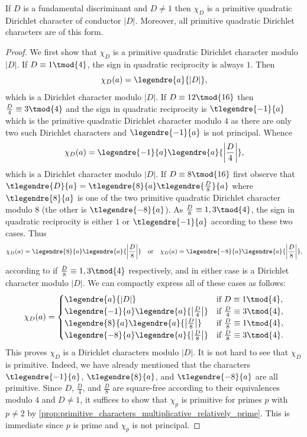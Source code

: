 \documentclass[12pt]{article}
\begin{document}
      \begin{theorem}\label{thm:fundamental_discriminant_character_primitive}
        If \(D\) is a fundamental discriminant and \(D \neq 1\) then \(\chi_{D}\) is a primitive quadratic Dirichlet character of conductor \(|D|\). Moreover, all primitive quadratic Dirichlet characters are of this form.
      \end{theorem}
      \begin{proof}
        We first show that \(\chi_{D}\) is a primitive quadratic Dirichlet character modulo \(|D|\). If \(D \equiv 1 \tmod{4}\), the sign in quadratic reciprocity is always \(1\). Then
        \[
          \chi_{D}(a) = \legendre{a}{|D|},
        \]
        which is a Dirichlet character modulo \(|D|\). If \(D \equiv 12 \tmod{16}\) then \(\frac{D}{4} \equiv 3 \tmod{4}\) and the sign in quadratic reciprocity is \(\tlegendre{-1}{a}\) which is the primitive quadratic Dirichlet character modulo \(4\) as there are only two such Dirichlet characters and \(\legendre{-1}{a}\) is not principal. Whence
        \[
          \chi_{D}(a) = \legendre{-1}{a}\legendre{a}{\left|\frac{D}{4}\right|},
        \]
        which is a Dirichlet character modulo \(|D|\). If \(D \equiv 8 \tmod{16}\) first observe that \(\tlegendre{D}{a} = \tlegendre{8}{a}\tlegendre{\frac{D}{8}}{a}\) where \(\tlegendre{8}{a}\) is one of the two primitive quadratic Dirichlet character modulo \(8\) (the other is \(\tlegendre{-8}{a}\)). As \(\frac{D}{8} \equiv 1,3 \tmod{4}\), the sign in quadratic reciprocity is either \(1\) or \(\tlegendre{-1}{a}\) according to these two cases. Thus
        \[
          \chi_{D}(a) = \legendre{8}{a}\legendre{a}{\left|\frac{D}{8}\right|} \quad \text{or} \quad \chi_{D}(a) = \legendre{-8}{a}\legendre{a}{\left|\frac{D}{8}\right|},
        \]
        according to if \(\frac{D}{8} \equiv 1,3 \tmod{4}\) respectively, and in either case is a Dirichlet character modulo \(|D|\). We can compactly express all of these cases as follows:
        \[
          \chi_{D}(a) = \begin{cases} \legendre{a}{|D|} & \text{if \(D \equiv 1 \tmod{4}\)}, \\ \legendre{-1}{a}\legendre{a}{\left|\frac{D}{4}\right|} & \text{if \(\frac{D}{4} \equiv 3 \tmod{4}\)}, \\ \legendre{8}{a}\legendre{a}{\left|\frac{D}{8}\right|} & \text{if \(\frac{D}{8} \equiv 1 \tmod{4}\)}, \\ \legendre{-8}{a}\legendre{a}{\left|\frac{D}{8}\right|} & \text{if \(\frac{D}{8} \equiv 3 \tmod{4}\)}. \end{cases}
        \]
        This proves \(\chi_{D}\) is a Dirichlet characters modulo \(|D|\). It is not hard to see that \(\chi_{D}\) is primitive. Indeed, we have already mentioned that the characters \(\tlegendre{-1}{a}\), \(\tlegendre{8}{a}\), and \(\tlegendre{-8}{a}\) are all primitive. Since \(D\), \(\frac{D}{4}\), and \(\frac{D}{8}\) are square-free according to their equivalences modulo \(4\) and \(D \neq 1\), it suffices to show that \(\chi_{p}\) is primitive for primes \(p\) with \(p \neq 2\) by \cref{prop:primitive_characters_multiplicative_relatively_prime}. This is immediate since \(p\) is prime and \(\chi_{p}\) is not principal. 
        

\end{proof}
\end{document}
